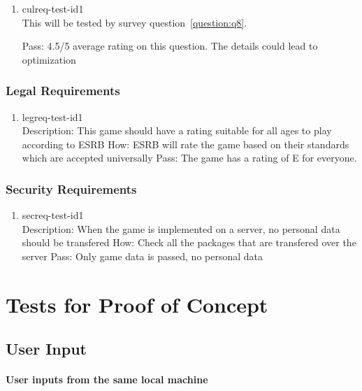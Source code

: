 \documentclass[12pt, titlepage]{article}
\begin{document}
\begin{enumerate}

\item{culreq-test-id1\\}
This will be tested by survey question~\ref{question:q8}.

Pass: 4.5/5 average rating on this question. The details could lead to optimization
\end{enumerate}

\subsubsection{Legal Requirements}

\begin{enumerate}

\item{legreq-test-id1\\}
Description: This game should have a rating suitable for all ages to play according to ESRB
How: ESRB will rate the game based on their standards which are accepted universally
Pass: The game has a rating of E for everyone.
\end{enumerate}

\subsubsection{Security Requirements}

\begin{enumerate}

\item{secreq-test-id1\\}
Description: When the game is implemented on a server, no personal data should be transfered
How: Check all the packages that are transfered over the server
Pass: Only game data is passed, no personal data
\end{enumerate}

\section{Tests for Proof of Concept} \label{POC}

\subsection{User Input}
		
\paragraph{User inputs from the same local machine}
\end{document}
